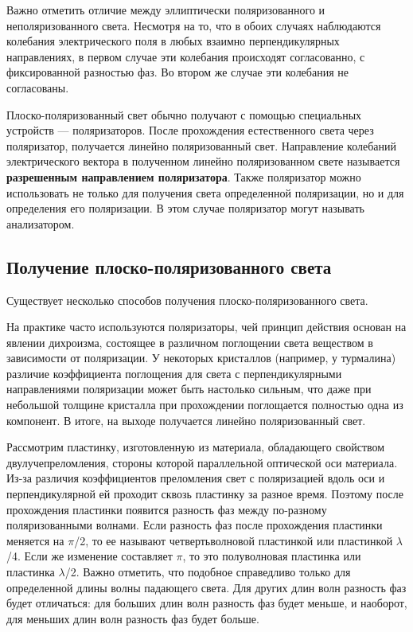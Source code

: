\documentclass[a4paper, 12pt]{article}
\begin{document}
Важно отметить отличие между эллиптически поляризованного и неполяризованного света. Несмотря на то, что в обоих случаях наблюдаются колебания электрического поля в любых взаимно перпендикулярных направлениях, в первом случае эти колебания происходят согласованно, с фиксированной разностью фаз. Во втором же случае эти колебания не согласованы.



Плоско-поляризованный свет обычно получают с помощью специальных устройств — поляризаторов. После прохождения естественного света через поляризатор, получается линейно поляризованный свет. Направление колебаний электрического вектора в полученном линейно поляризованном свете называется \textbf{разрешенным направлением поляризатора}. Также поляризатор можно использовать не только для получения света определенной поляризации, но и для определения его поляризации. В этом случае поляризатор могут называть анализатором.

\subsection{Получение плоско-поляризованного света}

Существует несколько способов получения плоско-поляризованного света.


На практике часто используются поляризаторы, чей принцип действия основан на явлении дихроизма, состоящее в различном поглощении света веществом в зависимости от поляризации. У некоторых кристаллов (например, у турмалина) различие коэффициента поглощения для света с перпендикулярными направлениями поляризации может быть настолько сильным, что даже при небольшой толщине кристалла при прохождении поглощается полностью одна из компонент. В итоге, на выходе получается линейно поляризованный свет.



Рассмотрим пластинку, изготовленную из материала, обладающего свойством двулучепреломления, стороны которой параллельной оптической оси материала. Из-за различия коэффициентов преломления свет с поляризацией вдоль оси и перпендикулярной ей проходит сквозь пластинку за разное время. Поэтому после прохождения пластинки появится разность фаз между по-разному поляризованными волнами. Если разность фаз после прохождения пластинки меняется на $\pi$/2, то ее называют четвертьволновой пластинкой или пластинкой $\lambda$/4. Если же изменение составляет $\pi$, то это полуволновая пластинка или пластинка $\lambda$/2. Важно отметить, что подобное справедливо только для определенной длины волны падающего света. Для других длин волн разность фаз будет отличаться: для больших длин волн разность фаз будет меньше, и наоборот, для меньших длин волн разность фаз будет больше.
\end{document}
